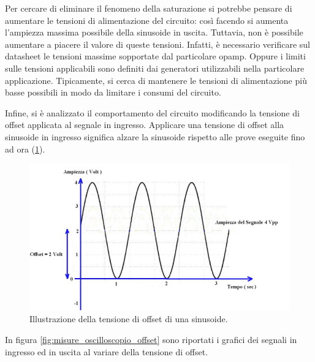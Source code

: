 \noindent
Per cercare di eliminare il fenomeno della saturazione si potrebbe pensare di aumentare le tensioni di alimentazione del circuito: così facendo si aumenta l'ampiezza massima possibile della sinusoide in uscita. Tuttavia, non è possibile aumentare a piacere il valore di queste tensioni. Infatti, è necessario verificare sul datasheet le tensioni massime sopportate dal particolare opamp. Oppure i limiti sulle tensioni applicabili sono definiti dai generatori utilizzabili nella particolare applicazione. Tipicamente, si cerca di mantenere le tensioni di alimentazione più basse possibili in modo da limitare i consumi del circuito.


Infine, si è analizzato il comportamento del circuito modificando la tensione di offset applicata al segnale in ingresso. Applicare una tensione di offset alla sinusoide in ingresso significa alzare la sinusoide rispetto alle prove eseguite fino ad ora (\Fig\ref{fig:misure_oscilloscopio_offset_sinusoide}).
\begin{figure}[h!]
	\centering
	\includegraphics[width=0.6\linewidth]{./ImageFiles/Laboratorio 1/tensione offset}
	\caption{Illustrazione della tensione di offset di una sinusoide.}
	\label{fig:misure_oscilloscopio_offset_sinusoide}
\end{figure} 

\noindent
In figura \ref{fig:misure_oscilloscopio_offset} sono riportati i grafici dei segnali in ingresso ed in uscita al variare della tensione di offset.

